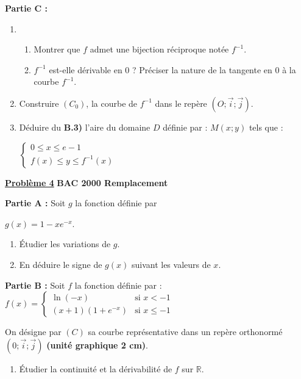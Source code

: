 \documentclass[12pt,a4paper]{article}
\newcommand{\exo}[1]{%
        \textbf{\underline{Problème #1}}
}
\begin{document}
\begin{multicols}{2}
\textbf{Partie C :}
\begin{enumerate}
\item 
    \begin{enumerate}
        \item Montrer que \( f \) admet une bijection réciproque notée \( f^{-1} \).
        \item \( f^{-1} \) est-elle dérivable en 0 ? Préciser la nature de la tangente en 0 à la courbe \( f^{-1} \).
    \end{enumerate}
    \item Construire \( (C_0) \), la courbe de \( f^{-1} \) dans le repère \( (O ; \vec{i} ; \vec{j}) \).

    \item Déduire du \textbf{B.3)} l’aire du domaine \( D \) définie par : \( M(x ; y) \) tels que :
    
    \(
    \left\{
    \begin{array}{l}
    0 \leq x \leq e - 1 \\
    f(x) \leq y \leq f^{-1}(x)
    \end{array}
    \right.
    \)
\end{enumerate}

\exo{4} \textbf{BAC 2000 Remplacement}

\textbf{Partie A :} Soit \( g \) la fonction définie par 

\( g(x) = 1 - x e^{-x} \).

\begin{enumerate}
    \item Étudier les variations de \( g \).
    \item En déduire le signe de \( g(x) \) suivant les valeurs de \( x \).
\end{enumerate}

\textbf{Partie B :} Soit \( f \) la fonction définie par :\\
\(
f(x) =
\begin{cases}
\ln(-x) & \text{si } x < -1 \\
(x + 1)(1 + e^{-x}) & \text{si } x \leq -1
\end{cases}
\)

On désigne par \( (C) \) sa courbe représentative dans un repère orthonormé \( (0 ; \vec{i} ; \vec{j}) \) \textbf{(unité graphique 2 cm)}.

\begin{enumerate}
    \item Étudier la continuité et la dérivabilité de \( f \) sur \( \mathbb{R} \).


\end{enumerate}
\end{multicols}
\end{document}
